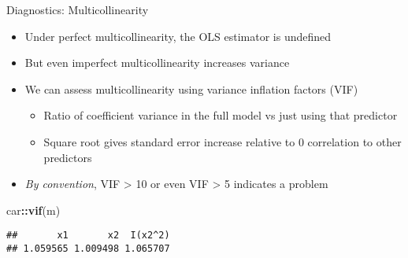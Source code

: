 \documentclass[
  ignorenonframetext,
]{beamer}
\newenvironment{Shaded}{\begin{snugshade}}{\end{snugshade}}
\newcommand{\FunctionTok}[1]{\textcolor[rgb]{0.13,0.29,0.53}{\textbf{#1}}}
\newcommand{\NormalTok}[1]{#1}
\newcommand{\SpecialCharTok}[1]{\textcolor[rgb]{0.81,0.36,0.00}{\textbf{#1}}}
\providecommand{\tightlist}{%
  \setlength{\itemsep}{0pt}\setlength{\parskip}{0pt}}
\newcommand{\setsep}{\setlength{\itemsep}{3pt}}
\newcommand{\setskip}{\setlength{\parskip}{3pt}}
\renewcommand{\tightlist}{\setsep\setskip}
\begin{document}
\begin{frame}[fragile]{Diagnostics: Multicollinearity}
\protect\hypertarget{diagnostics-multicollinearity}{}
\pause

\begin{itemize}[<+->]
\tightlist
\item
  Under perfect multicollinearity, the OLS estimator is undefined
\item
  But even imperfect multicollinearity increases variance
\item
  We can assess multicollinearity using variance inflation factors (VIF)

  \begin{itemize}[<+->]
  \tightlist
  \item
    Ratio of coefficient variance in the full model vs just using that predictor
  \item
    Square root gives standard error increase relative to 0 correlation to other predictors
  \end{itemize}
\item
  \emph{By convention}, VIF \textgreater{} 10 or even VIF \textgreater{} 5 indicates a problem
\end{itemize}

\pause

\begin{Shaded}
\begin{Highlighting}[]
\NormalTok{car}\SpecialCharTok{::}\FunctionTok{vif}\NormalTok{(m)}
\end{Highlighting}
\end{Shaded}

\begin{verbatim}
##       x1       x2  I(x2^2) 
## 1.059565 1.009498 1.065707
\end{verbatim}
\end{frame}
\end{document}
